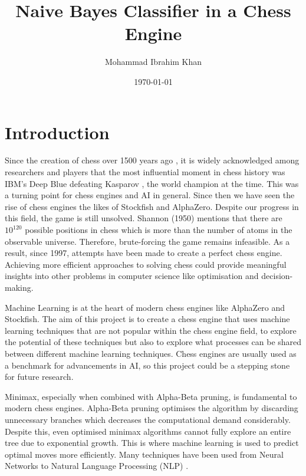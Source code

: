 \documentclass[20pt]{informatics-report}
\title{Naive Bayes Classifier in a Chess Engine}
\author{Mohammad Ibrahim Khan}
\date{\today}
\begin{document}
\createFrontMatter
\onehalfspacing
\tableofcontents
\doublespacing


\chapter{Introduction}


Since the creation of chess over 1500 years ago \cite{davidsonShortHistoryChess2012}, it is widely acknowledged among researchers and players that the most influential moment in chess history was IBM's Deep Blue defeating Kasparov \cite{hsuIBMsDeepBlue1999}, the world champion at the time. This was a turning point for chess engines and AI in general.
Since then we have seen the rise of chess engines the likes of Stockfish and AlphaZero. Despite our progress in this field, the game is still unsolved. Shannon (1950) mentions that there are $10^{120}$ possible positions in chess \cite{shannonXXIIProgrammingComputer1950} which is more than the number of atoms in the observable universe. Therefore, brute-forcing the game remains infeasible. As a result, since 1997, attempts have been made to create a perfect chess engine. Achieving more efficient approaches to solving chess could provide meaningful insights into other problems in computer science like optimisation and decision-making.

Machine Learning is at the heart of modern chess engines like AlphaZero and Stockfish.  
The aim of this project is to create a chess engine that uses machine learning techniques that are not popular within the chess engine field, to explore the potential of these techniques but also to explore what processes can be shared between different machine learning techniques.
Chess engines are usually used as a benchmark for advancements in AI, so this project could be a stepping stone for future research. 

Minimax, especially when combined with Alpha-Beta pruning, is fundamental to modern chess engines. Alpha-Beta pruning optimises the algorithm by discarding unnecessary branches which decreases the computational demand considerably. Despite this, even optimised minimax algorithms cannot fully explore an entire tree due to exponential growth. This is where machine learning is used to predict optimal moves more efficiently. Many techniques have been used from Neural Networks \cite{kleinNeuralNetworksChess2022} to Natural Language Processing (NLP) \cite{NLPinChess}. 
\end{document}
